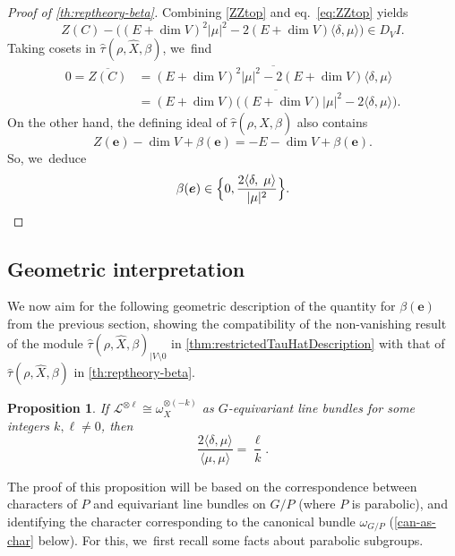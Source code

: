 \documentclass[11pt]{article}
\newcommand{\bme}{{\boldsymbol{e}}}
\newtheorem{prop}[thm]{Proposition}
\newcommand{\Ell}{\mathscr{L}}
\newcommand\restr[2]{{#1_{| {#2}}}}
\begin{document}
\begin{proof}[Proof of \cref{th:reptheory-beta}]
Combining \cref{ZZtop} and eq.~\eqref{eq:ZZtop} yields\vspace*{-3pt}
\begin{equation*}
Z(C) - \bigl((E+\dim{V})^2|\mu|^2 - 2(E+\dim{V})\langle\delta,\mu\rangle\bigr)\in D_V I.
\end{equation*}
Taking cosets in $\hat\tau(\rho, \hat{X},\beta)$, we~find\vspace*{-3pt}
\begin{align*}
0 = \overline{Z(C)}
&= \overline{(E+\dim{V})^2|\mu|^2 - 2(E+\dim{V})\langle\delta,\mu\rangle}\\
&= \overline{(E+\dim{V})\bigl((E+\dim{V})|\mu|^2 - 2\langle\delta,\mu\rangle\bigr)}.
\end{align*}
On the other hand, the defining ideal of $\hat\tau(\rho, \hat{X},\beta)$ also contains\vspace*{-3pt}
\[
Z(\bme) -\dim{V} + \beta(\bme) = -E - \dim{V} + \beta(\bme).
\]
So, we~deduce\vspace*{-3pt}
\[
\beta(\bme) \in \Bigl\{0, \frac{2\langle\delta,\;\mu\rangle}{|\mu|^2}\Bigr\}.\qedhere
\]
\end{proof}

\subsection{Geometric interpretation}

We now aim for the following geometric description of the quantity for $\beta(\bme)$ from the previous section, showing the compatibility of the non-vanishing result of the module $\restr{\hat{\tau}(\rho,\hat X, \beta)}{V \setminus 0}$ in \cref{thm:restrictedTauHatDescription} with that of
$\hat{\tau}(\rho,\hat{X},\beta)$ in \cref{th:reptheory-beta}.

\begin{prop} \label{prop:repTheoreticDescription}
If $\Ell^{\otimes \ell} \cong \omega_X^{\otimes (-k)}$ as $G$-equivariant line bundles for some integers $k, \ell \neq 0$, then\vspace*{-3pt}
\[
\frac{2\langle \delta, \mu \rangle}{\langle \mu, \mu \rangle} = \frac{\ell}{k}.
\]
\end{prop}

The proof of this proposition will be based on the correspondence between characters of $P$ and equivariant line bundles on $G/P$ (where $P$ is parabolic), and identifying the character corresponding to the canonical bundle $\omega_{G/P}$ (\cref{can-as-char} below). For this, we~first recall some facts about parabolic subgroups.
\end{document}

